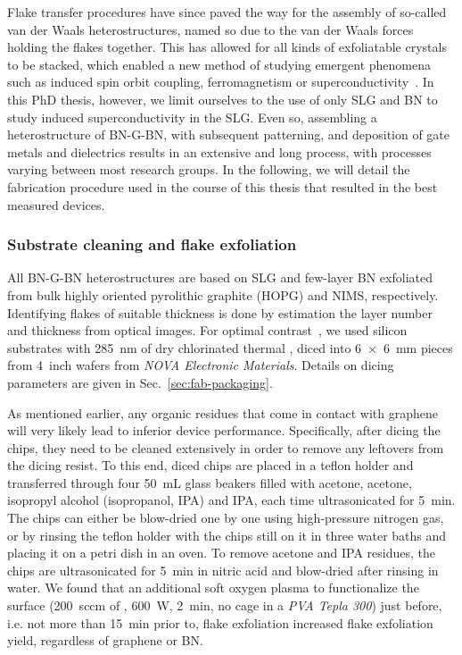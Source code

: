 Flake transfer procedures have since paved the way for the assembly of so-called van der Waals heterostructures, named so due to the van der Waals forces holding the flakes together.
%
This has allowed for all kinds of exfoliatable crystals to be stacked, which enabled a new method of studying emergent phenomena such as induced spin orbit coupling, ferromagnetism or superconductivity~\cite{geimVanWaalsHeterostructures2013a,novoselov2DMaterialsVan2016}.
%
In this PhD thesis, however, we limit ourselves to the use of only SLG and BN to study induced superconductivity in the SLG.
%
Even so, assembling a heterostructure of BN-G-BN, with subsequent patterning, and deposition of gate metals and dielectrics results in an extensive and long process, with processes varying between most research groups.
% 
In the following, we will detail the fabrication procedure used in the course of this thesis that resulted in the best measured devices.

\subsubsection{Substrate cleaning and flake exfoliation}

All BN-G-BN heterostructures are based on SLG and few-layer BN exfoliated from bulk highly oriented pyrolithic graphite (HOPG) and NIMS, respectively.
% 
Identifying flakes of suitable thickness is done by estimation the layer number and thickness from optical images.
% 
For optimal contrast~\cite{blakeMakingGrapheneVisible2007b}, we used silicon substrates with \SI{285}{\nano\meter} of dry chlorinated thermal , diced into \SI{6x6}{\milli\meter} pieces from \SI{4}{inch} wafers from \textit{NOVA Electronic Materials}.
% 
Details on dicing parameters are given in Sec.~\ref{sec:fab-packaging}.


As mentioned earlier, any organic residues that come in contact with graphene will very likely lead to inferior device performance.
% 
Specifically, after dicing the chips, they need to be cleaned extensively in order to remove any leftovers from the dicing resist.
% 
To this end, diced chips are placed in a teflon holder and transferred through four \SI{50}{\milli\liter} glass beakers filled with acetone, acetone, isopropyl alcohol (isopropanol, IPA) and IPA, each time ultrasonicated for \SI{5}{\minute}.
% 
The chips can either be blow-dried one by one using high-pressure nitrogen gas, or by rinsing the teflon holder with the chips still on it in three water baths and placing it on a petri dish in an oven.
% 
To remove acetone and IPA residues, the chips are ultrasonicated for \SI{5}{\minute} in nitric acid and blow-dried after rinsing in water.
% 
We found that an additional soft oxygen plasma to functionalize the  surface (\SI{200}{sccm} of , \SI{600}{\watt}, \SI{2}{\minute}, no cage in a \textit{PVA Tepla 300}) just before, i.e. not more than \SI{15}{\minute} prior to, flake exfoliation increased flake exfoliation yield, regardless of graphene or BN.

